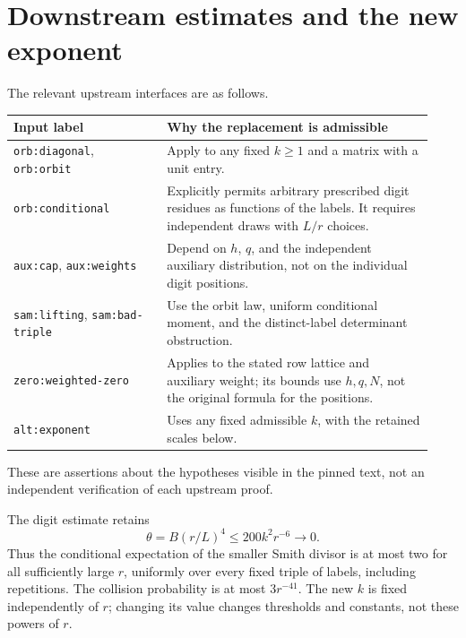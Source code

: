 \documentclass[11pt]{article}
\begin{document}
\section{Downstream estimates and the new exponent}
The relevant upstream interfaces are as follows.
\begin{center}\small
\begin{tabular}{p{0.34\linewidth}p{0.59\linewidth}}
\toprule
Input label & Why the replacement is admissible\\
\midrule
\texttt{orb:diagonal}, \texttt{orb:orbit}
& Apply to any fixed \(k\ge1\) and a matrix with a unit entry.\\
\texttt{orb:conditional}
& Explicitly permits arbitrary prescribed digit residues as functions
of the labels. It requires independent draws with \(L/r\) choices.\\
\texttt{aux:cap}, \texttt{aux:weights}
& Depend on \(h\), \(q\), and the independent auxiliary distribution,
not on the individual digit positions.\\
\texttt{sam:lifting}, \texttt{sam:bad-triple}
& Use the orbit law, uniform conditional moment, and the
distinct-label determinant obstruction.\\
\texttt{zero:weighted-zero}
& Applies to the stated row lattice and auxiliary weight; its
bounds use \(h,q,N\), not the original formula for the positions.\\
\texttt{alt:exponent}
& Uses any fixed admissible \(k\), with the retained scales below.\\
\bottomrule
\end{tabular}
\end{center}
These are assertions about the hypotheses visible in the pinned
text, not an independent verification of each upstream proof.

The digit estimate retains
\[
 \theta=B(r/L)^4\le200k^2r^{-6}\longrightarrow0.
\]
Thus the conditional expectation of the smaller Smith divisor is at
most two for all sufficiently large \(r\), uniformly over every
fixed triple of labels, including repetitions.
The collision probability is at most \(3r^{-41}\).
The new \(k\) is fixed independently of \(r\); changing its value
changes thresholds and constants, not these powers of \(r\).
\end{document}
